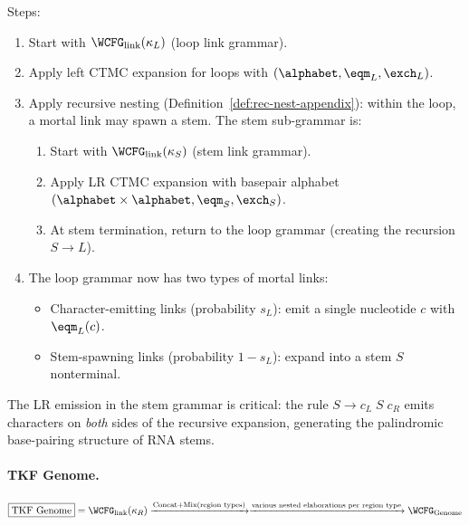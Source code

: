 \noindent Steps:
\begin{enumerate}
\item Start with $\WCFG_{\mathrm{link}}(\kappa_L)$ (loop link grammar).
\item Apply left CTMC expansion for loops
  with $(\alphabet, \eqm_L, \exch_L)$.
\item Apply recursive nesting (Definition~\ref{def:rec-nest-appendix}):
  within the loop, a mortal link may spawn a stem.
  The stem sub-grammar is:
  \begin{enumerate}
  \item Start with $\WCFG_{\mathrm{link}}(\kappa_S)$ (stem link grammar).
  \item Apply LR CTMC expansion with basepair alphabet
    $(\alphabet \times \alphabet, \eqm_S, \exch_S)$.
  \item At stem termination, return to the loop grammar
    (creating the recursion $S \to L$).
  \end{enumerate}
\item The loop grammar now has two types of mortal links:
  \begin{itemize}
  \item Character-emitting links (probability $s_L$):
    emit a single nucleotide $c$ with $\eqm_L(c)$.
  \item Stem-spawning links (probability $1 - s_L$):
    expand into a stem $S$ nonterminal.
  \end{itemize}
\end{enumerate}

The LR emission in the stem grammar is critical:
the rule $S \to c_L\;S\;c_R$ emits characters on
\emph{both} sides of the recursive expansion,
generating the palindromic base-pairing structure of RNA stems.

\paragraph{TKF Genome.}

\begin{equation*}
\boxed{\text{TKF Genome}} =
\WCFG_{\mathrm{link}}(\kappa_R)
\xrightarrow{\text{Concat+Mix(region types)}}
\xrightarrow{\text{various nested elaborations per region type}}
\WCFG_{\mathrm{Genome}}
\end{equation*}


